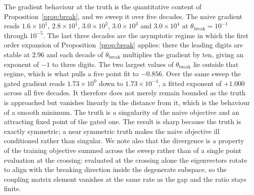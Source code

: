 \documentclass[10pt,a4paper]{amsart}
\begin{document}
The gradient behaviour at the truth is the quantitative content of
Proposition~\ref{prop:break}, and we sweep it over five decades. The naive
gradient reads $1.6\times10^{1}$, $2.8\times10^{1}$, $3.0\times10^{2}$,
$3.0\times10^{3}$ and $3.0\times10^{4}$ at $\theta_{\mathrm{break}}=10^{-1}$
through $10^{-5}$. The last three decades are the asymptotic regime in which the
first order expansion of Proposition~\ref{prop:break} applies: there the leading
digits are stable at $2.96$ and each decade of $\theta_{\mathrm{break}}$
multiplies the gradient by ten, giving an exponent of $-1$ to three digits. The
two largest values of $\theta_{\mathrm{break}}$ lie outside that regime, which is
what pulls a five point fit to $-0.856$. Over the same sweep the gated gradient
reads $1.73\times10^{0}$ down to $1.73\times10^{-4}$, a fitted exponent of
$+1.000$ across all five decades. It therefore does not merely remain bounded as
the truth is approached but vanishes linearly in the distance from it, which is
the behaviour of a smooth minimum. The truth is a singularity of the naive
objective and an attracting fixed point of the gated one. The result is sharp
because the truth is exactly symmetric; a near symmetric truth makes the naive
objective ill conditioned rather than singular. We note also that the divergence
is a property of the training objective summed across the sweep rather than of a
single point evaluation at the crossing: evaluated at the crossing alone the
eigenvectors rotate to align with the breaking direction inside the degenerate
subspace, so the coupling matrix element vanishes at the same rate as the gap and
the ratio stays finite.
\end{document}
